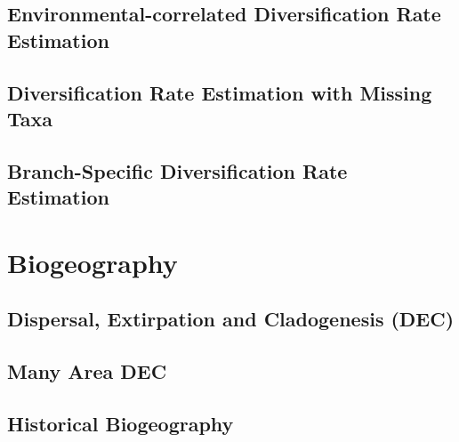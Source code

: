 \documentclass[11pt]{book}
\begin{document}
\chapter{Environmental-correlated Diversification Rate Estimation}
\def \ResourcePath {RB_DiversificationRate_Environmental_Tutorial/}


\chapter{Diversification Rate Estimation with Missing Taxa}
\def \ResourcePath {RB_DiversificationRate_Sampling_Tutorial/}


\chapter{Branch-Specific Diversification Rate Estimation}
\def \ResourcePath {RB_DiversificationRate_BranchSpecific_Tutorial/}




\part{Biogeography}

\chapter{Dispersal, Extirpation and Cladogenesis (DEC)}
\def \ResourcePath {RB_Biogeography_DEC_Tutorial/}


\chapter{Many Area DEC}
\def \ResourcePath {RB_Biogeography_many_area_Tutorial/}


\chapter{Historical Biogeography}
\def \ResourcePath {RB_Biogeography_Tutorial/}





\end{document}
